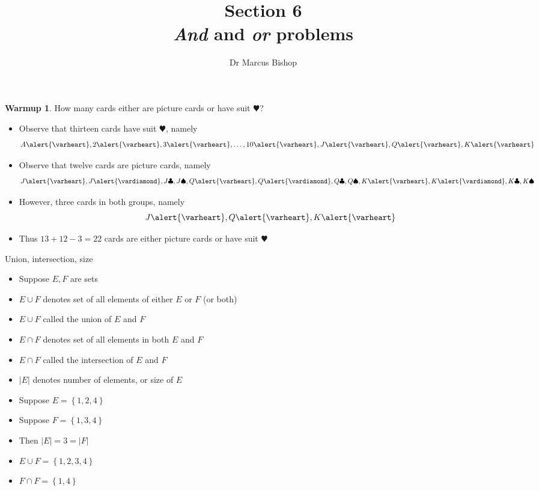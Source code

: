 \documentclass[handout]{beamer}
\title[\S6]{Section 6\\{\em And} and {\em or} problems}
\author{Dr Marcus Bishop}
\theoremstyle{definition}
\newtheorem{warmup}{Warmup}
\begin{document}
\begin{frame}\titlepage\end{frame}
\LogoOff

\begin{frame}
\begin{warmup}
How many cards \alert{either} are picture cards \alert{or} have
suit \alert{$\varheart$}?
\end{warmup}
\begin{itemize}
\item Observe that thirteen cards have
suit \alert{$\varheart$}, namely
\[A\alert{\varheart},
2\alert{\varheart},
3\alert{\varheart},\ldots,
10\alert{\varheart},
J\alert{\varheart},
Q\alert{\varheart},
K\alert{\varheart}\]
\item Observe that twelve cards are picture cards, namely
\[J\alert{\varheart},J\alert{\vardiamond},J\clubsuit,J\spadesuit,
Q\alert{\varheart},Q\alert{\vardiamond},Q\clubsuit,Q\spadesuit,
K\alert{\varheart},K\alert{\vardiamond},K\clubsuit,K\spadesuit\]
\item However, \alert{three} cards in both groups,
namely
\[J\alert{\varheart},Q\alert{\varheart},K\alert{\varheart}\]
\item Thus $13+12-3=22$ cards are either picture cards or have 
suit \alert{$\varheart$}
\end{itemize}
\end{frame}

\begin{frame}{Union, intersection, size}
\begin{itemize}
\item Suppose $E,F$ are sets
\item $E\cup F$ denotes set of all elements of \alert{either}
$E$ \alert{or} $F$ (or \alert{both})
\item $E\cup F$ called the \alert{union} of $E$ and $F$
\item $E\cap F$ denotes set of all elements in \alert{both}
$E$ \alert{and} $F$
\item $E\cap F$ called the \alert{intersection} of $E$ and $F$
\item $\left|E\right|$ denotes number of elements,
or \alert{size} of $E$
\end{itemize}
\begin{example}
\begin{itemize}
\item Suppose $E=\left\{1,2,4\right\}$
\item Suppose $F=\left\{1,3,4\right\}$
\item Then $\left|E\right|=3=\left|F\right|$
\item $E\cup F=\left\{1,2,3,4\right\}$
\item $F\cap F=\left\{1,4\right\}$
\end{itemize}
\end{example}
\end{frame}
\end{document}
